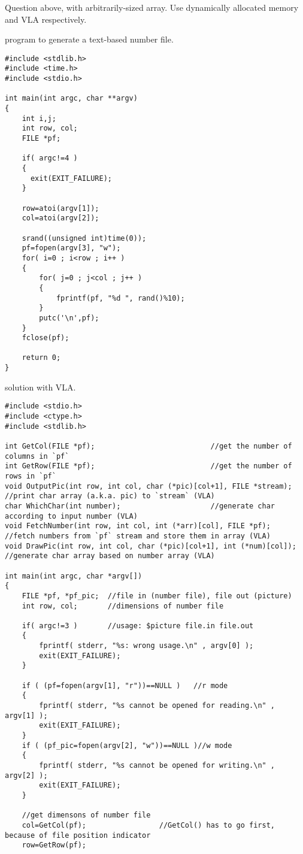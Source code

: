 \begin{question}
  Question above, with arbitrarily-sized array. Use dynamically allocated memory and VLA respectively.
\end{question}
\begin{solution}
  program to generate a text-based number file.
  \begin{verbatim}
#include <stdlib.h>
#include <time.h>
#include <stdio.h>

int main(int argc, char **argv)
{
	int i,j;
	int row, col;
	FILE *pf;

	if( argc!=4 )
	{
	  exit(EXIT_FAILURE);
	}

	row=atoi(argv[1]);
	col=atoi(argv[2]);

	srand((unsigned int)time(0));
	pf=fopen(argv[3], "w");
	for( i=0 ; i<row ; i++ )
	{
		for( j=0 ; j<col ; j++ )
		{
			fprintf(pf, "%d ", rand()%10);
		}
		putc('\n',pf);
	}
	fclose(pf);

	return 0;
}
  \end{verbatim}
  solution with VLA.
  \begin{verbatim}
#include <stdio.h>
#include <ctype.h>
#include <stdlib.h>

int GetCol(FILE *pf);							//get the number of columns in `pf`
int GetRow(FILE *pf);							//get the number of rows in `pf`
void OutputPic(int row, int col, char (*pic)[col+1], FILE *stream);	//print char array (a.k.a. pic) to `stream` (VLA)
char WhichChar(int number);						//generate char according to input number (VLA)
void FetchNumber(int row, int col, int (*arr)[col], FILE *pf);	//fetch numbers from `pf` stream and store them in array (VLA)
void DrawPic(int row, int col, char (*pic)[col+1], int (*num)[col]);	//generate char array based on number array (VLA)

int main(int argc, char *argv[])
{
	FILE *pf, *pf_pic;	//file in (number file), file out (picture)
	int row, col;		//dimensions of number file

	if( argc!=3 )		//usage: $picture file.in file.out
	{
		fprintf( stderr, "%s: wrong usage.\n" , argv[0] );
		exit(EXIT_FAILURE);
	}

	if ( (pf=fopen(argv[1], "r"))==NULL )	//r mode
	{
		fprintf( stderr, "%s cannot be opened for reading.\n" , argv[1] );
		exit(EXIT_FAILURE);
	}
	if ( (pf_pic=fopen(argv[2], "w"))==NULL )//w mode
	{
		fprintf( stderr, "%s cannot be opened for writing.\n" , argv[2] );
		exit(EXIT_FAILURE);
	}

	//get dimensons of number file
	col=GetCol(pf);		 			//GetCol() has to go first, because of file position indicator
	row=GetRow(pf);


\end{verbatim}
\end{solution}
